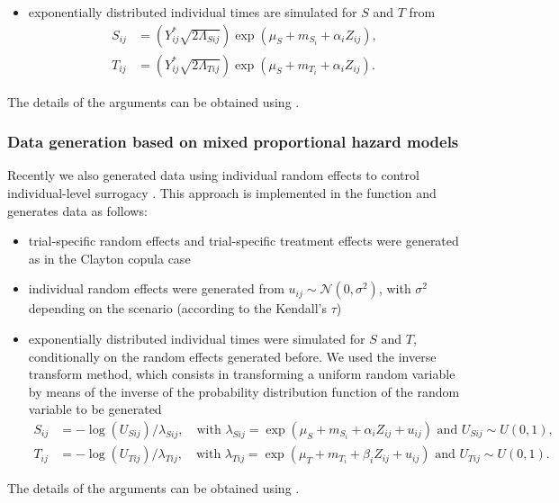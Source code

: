 \documentclass[]{scrartcl}\usepackage[]{graphicx}\usepackage[]{color}
\begin{document}
{{\begin{itemize}
      with $U_{Sij} \sim U(0,1)$ and $U_{Tij} \sim U(0,1)$
    \item exponentially distributed individual times are simulated
      for $S$ and $T$ from
      \begin{align*}
        S_{ij} &= \left(
        Y^\ast_{ij} \sqrt{2\Lambda_{Sij}}
        \right) \exp(\mu_S + m_{S_i} + \alpha_i Z_{ij}), \\
        T_{ij} &= \left(
        Y^\ast_{ij} \sqrt{2\Lambda_{Tij}}
        \right) \exp(\mu_S + m_{T_i} + \alpha_i Z_{ij}).
      \end{align*}
  \end{itemize}
The details of the arguments can be obtained using .

\subsubsection{Data generation based on mixed proportional hazard models}
Recently we also generated data using
  individual random effects to control individual-level surrogacy
  \citep{RotoloPoissurogate}.
  This approach is implemented in the function 
  and generates data as follows:
  \begin{itemize}
    \item trial-specific random effects and 
      trial-specific treatment effects were generated 
      as in the Clayton copula case
    \item individual random effects were generated from
      $u_{ij} \sim \mathcal N(0, \sigma^2)$,
      with $\sigma^2$ depending on the scenario
      (according to the Kendall's $\tau$)
    \item exponentially distributed individual times were simulated
      for $S$ and $T$, conditionally on the random effects generated before.
      We used the inverse transform method, 
      which consists in transforming a uniform random variable
      by means of the inverse of the probability distribution function
      of the random variable to be generated
      \cite[see for instance][\S~2.1.2]{RobertCasella10}
      \begin{align*}
        S_{ij} &= -\log(U_{Sij}) / \lambda_{Sij},
        \quad \text{with } 
        \lambda_{Sij} = \exp(\mu_S + m_{S_i} + \alpha_i Z_{ij} + u_{ij})
        \text{ and } U_{Sij} \sim U(0,1),
        \\
        T_{ij} &= -\log(U_{Tij}) / \lambda_{Tij},
        \quad \text{with }
        \lambda_{Tij} = \exp(\mu_T + m_{T_i} + \beta_i  Z_{ij} + u_{ij})
        \text{ and } U_{Tij} \sim U(0,1). 
      \end{align*}
  \end{itemize}
The details of the arguments can be obtained using .



}}
\end{document}
